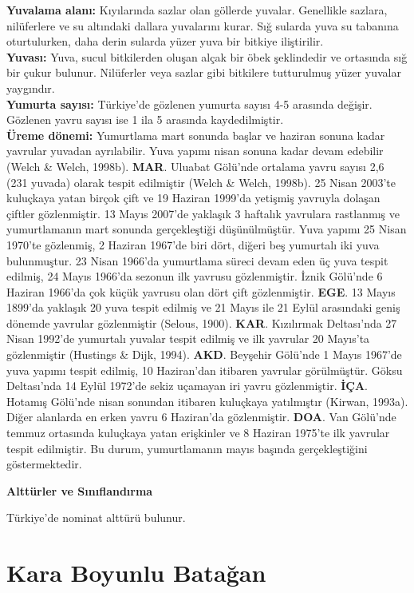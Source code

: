 \documentclass[
  a4paper,
  DIV=11,
  numbers=noendperiod]{scrreprt}
\begin{document}
\textbf{Yuvalama alanı:} Kıyılarında sazlar olan göllerde yuvalar.
Genellikle sazlara, nilüferlere ve su altındaki dallara yuvalarını
kurar. Sığ sularda yuva su tabanına oturtulurken, daha derin sularda
yüzer yuva bir bitkiye iliştirilir.\\
\textbf{Yuvası:} Yuva, sucul bitkilerden oluşan alçak bir öbek
şeklindedir ve ortasında sığ bir çukur bulunur. Nilüferler veya sazlar
gibi bitkilere tutturulmuş yüzer yuvalar yaygındır.\\
\textbf{Yumurta sayısı:} Türkiye'de gözlenen yumurta sayısı 4-5 arasında
değişir. Gözlenen yavru sayısı ise 1 ila 5 arasında kaydedilmiştir.\\
\textbf{Üreme dönemi:} Yumurtlama mart sonunda başlar ve haziran sonuna
kadar yavrular yuvadan ayrılabilir. Yuva yapımı nisan sonuna kadar devam
edebilir (Welch \& Welch, 1998b). \textbf{MAR}. Uluabat Gölü'nde
ortalama yavru sayısı 2,6 (231 yuvada) olarak tespit edilmiştir (Welch
\& Welch, 1998b). 25 Nisan 2003'te kuluçkaya yatan birçok çift ve 19
Haziran 1999'da yetişmiş yavruyla dolaşan çiftler gözlenmiştir. 13 Mayıs
2007'de yaklaşık 3 haftalık yavrulara rastlanmış ve yumurtlamanın mart
sonunda gerçekleştiği düşünülmüştür. Yuva yapımı 25 Nisan 1970'te
gözlenmiş, 2 Haziran 1967'de biri dört, diğeri beş yumurtalı iki yuva
bulunmuştur. 23 Nisan 1966'da yumurtlama süreci devam eden üç yuva
tespit edilmiş, 24 Mayıs 1966'da sezonun ilk yavrusu gözlenmiştir. İznik
Gölü'nde 6 Haziran 1966'da çok küçük yavrusu olan dört çift
gözlenmiştir. \textbf{EGE}. 13 Mayıs 1899'da yaklaşık 20 yuva tespit
edilmiş ve 21 Mayıs ile 21 Eylül arasındaki geniş dönemde yavrular
gözlenmiştir (Selous, 1900). \textbf{KAR}. Kızılırmak Deltası'nda 27
Nisan 1992'de yumurtalı yuvalar tespit edilmiş ve ilk yavrular 20
Mayıs'ta gözlenmiştir (Hustings \& Dijk, 1994). \textbf{AKD}. Beyşehir
Gölü'nde 1 Mayıs 1967'de yuva yapımı tespit edilmiş, 10 Haziran'dan
itibaren yavrular görülmüştür. Göksu Deltası'nda 14 Eylül 1972'de sekiz
uçamayan iri yavru gözlenmiştir. \textbf{İÇA}. Hotamış Gölü'nde nisan
sonundan itibaren kuluçkaya yatılmıştır (Kirwan, 1993a). Diğer alanlarda
en erken yavru 6 Haziran'da gözlenmiştir. \textbf{DOA}. Van Gölü'nde
temmuz ortasında kuluçkaya yatan erişkinler ve 8 Haziran 1975'te ilk
yavrular tespit edilmiştir. Bu durum, yumurtlamanın mayıs başında
gerçekleştiğini göstermektedir.

\textbf{Alttürler ve Sınıflandırma}

Türkiye'de nominat alttürü bulunur.

\section{Kara Boyunlu Batağan}\label{kara-boyunlu-bataux11fan}
\end{document}
